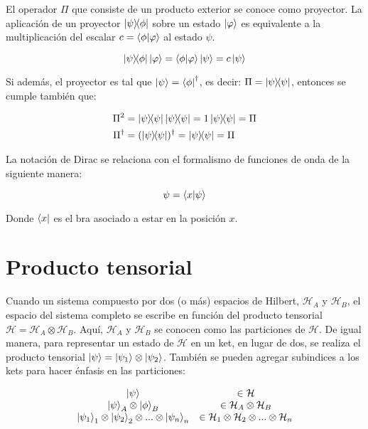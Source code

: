 El operador $\Pi$ que consiste de un producto exterior se conoce como proyector. La aplicación de un proyector $\ketbra{\psi}{\phi}$ sobre un estado $\ket{\varphi}$ es equivalente a la multiplicación del escalar $c = \braket{\phi}{\varphi}$ al estado $\psi$.

\begin{equation}
    \ketbra{\psi}{\phi} \ket{\varphi} = \braket{\phi}{\varphi} \ket{\psi} = c \ket{\psi}
\end{equation}

Si además, el proyector es tal que $\ket{\psi} = \bra{\phi}^\dagger$, es decir: $\Pi = \ketbra{\psi}{\psi}$, entonces se cumple también que:

\begin{align}
    \Pi^2 &= \ketbra{\psi}{\psi} \ketbra{\psi}{\psi} = 1 \ketbra{\psi}{\psi} = \Pi \\
    \Pi^\dagger &= (\ketbra{\psi}{\psi})^\dagger = \ketbra{\psi}{\psi} = \Pi
\end{align}

La notación de Dirac se relaciona con el formalismo de funciones de onda de la siguiente manera:

\begin{equation}
    \psi = \braket{x}{\psi}
\end{equation}

Donde $\bra{x}$ es el bra asociado a estar en la posición $x$.

\section{Producto tensorial}

Cuando un sistema compuesto por dos (o más) espacios de Hilbert, $\mathcal{H}_A$ y $\mathcal{H}_B$, el espacio del sistema completo se escribe en función del producto tensorial $\mathcal{H} = \mathcal{H}_A \otimes \mathcal{H}_B$. Aquí, $\mathcal{H}_A$ y $\mathcal{H}_B$ se conocen como las particiones de $\mathcal{H}$. De igual manera, para representar un estado de $\mathcal{H}$ en un ket, en lugar de dos, se realiza el producto tensorial $\ket{\psi} = \ket{\psi_1} \otimes \ket{\psi_2}$. También se pueden agregar subindices a los kets para hacer énfasis en las particiones:

\[
\begin{array}{c c}
    \ket{\psi} & \in \mathcal{H} \\
    \ket{\psi}_A \otimes \ket{\phi}_B & \in \mathcal{H}_A \otimes \mathcal{H}_B \\
    \ket{\psi_1}_1 \otimes \ket{\psi_2}_2 \otimes ... \otimes \ket{\psi_n}_n & \in \mathcal{H}_1 \otimes \mathcal{H}_2 \otimes ... \otimes \mathcal{H}_n
\end{array}
\]

